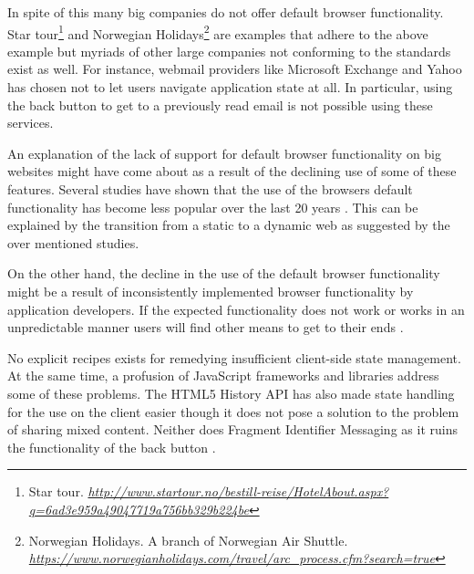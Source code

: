\documentclass[english]{ifimaster}
\begin{document}
In spite of this many big companies do not offer default browser functionality. Star tour\footnote{Star tour. \href{http://www.startour.no/bestill-reise/HotelAbout.aspx?q=6ad3e959a49047719a756bb329b224be}{\textit{http://www.startour.no/bestill-reise/HotelAbout.aspx?q=6ad3e959a49047719a756bb329b224be}}} and Norwegian Holidays\footnote{Norwegian Holidays. A branch of Norwegian Air Shuttle. \href{https://www.norwegianholidays.com/travel/arc\_process.cfm?search=true}{\textit{https://www.norwegianholidays.com/travel/arc\_process.cfm?search=true}}} are examples that adhere to the above example but myriads of other large companies not conforming to the standards exist as well. For instance, webmail providers like Microsoft Exchange and Yahoo has chosen not to let users navigate application state at all. In particular, using the back button to get to a previously read email is not possible using these services. 


An explanation of the lack of support for default browser functionality on big websites might have come about as a result of the declining use of some of these features. Several studies have shown that the use of the browsers default functionality has become less popular over the last 20 years \parencite{catledge} \parencite{cockburn} \parencite{obendorf} \parencite{zhang}. This can be explained by the transition from a static to a dynamic web as suggested by the over mentioned studies. 

On the other hand, the decline in the use of the default browser functionality might be a result of inconsistently implemented browser functionality by application developers. If the expected functionality does not work or works in an unpredictable manner users will find other means to get to their ends \parencite{obendorf}.

No explicit recipes exists for remedying insufficient client-side state management. At the same time, a profusion of JavaScript frameworks and libraries address some of these problems. The HTML5 History API has also made state handling for the use on the client easier though it does not pose a solution to the problem of sharing mixed content. Neither does Fragment Identifier Messaging as it ruins the functionality of the back button \parencite{jackson}.


\end{document}
